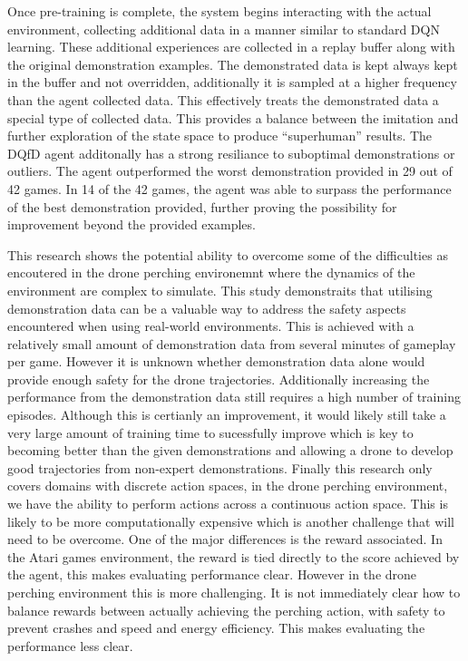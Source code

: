 Once pre-training is complete, the system begins interacting with the actual environment, collecting additional data in a manner similar to standard DQN learning.
These additional experiences are collected in a replay buffer along with the original demonstration examples.
The demonstrated data is kept always kept in the buffer and not overridden, additionally it is sampled at a higher frequency than the agent collected data.
This effectively treats the demonstrated data a special type of collected data.
This provides a balance between the imitation and further exploration of the state space to produce ``superhuman'' results.
The DQfD agent additonally has a strong resiliance to suboptimal demonstrations or outliers.
The agent outperformed the worst demonstration provided in 29 out of 42 games.
In 14 of the 42 games, the agent was able to surpass the performance of the best demonstration provided, further proving the possibility for improvement beyond the provided examples.

This research shows the potential ability to overcome some of the difficulties as encoutered in the drone perching environemnt where the dynamics of the environment are complex to simulate.
This study demonstraits that utilising demonstration data can be a valuable way to address the safety aspects encountered when using real-world environments.
This is achieved with a relatively small amount of demonstration data from several minutes of gameplay per game.
However it is unknown whether demonstration data alone would provide enough safety for the drone trajectories.
Additionally increasing the performance from the demonstration data still requires a high number of training episodes.
Although this is certianly an improvement, it would likely still take a very large amount of training time to sucessfully improve which is key to becoming better than the given demonstrations and allowing a drone to develop good trajectories from non-expert demonstrations.
Finally this research only covers domains with discrete action spaces, in the drone perching environment, we have the ability to perform actions across a continuous action space.
This is likely to be more computationally expensive which is another challenge that will need to be overcome.
One of the major differences is the reward associated.
In the Atari games environment, the reward is tied directly to the score achieved by the agent, this makes evaluating performance clear.
However in the drone perching environment this is more challenging.
It is not immediately clear how to balance rewards between actually achieving the perching action, with safety to prevent crashes and speed and energy efficiency.
This makes evaluating the performance less clear. \\\\


